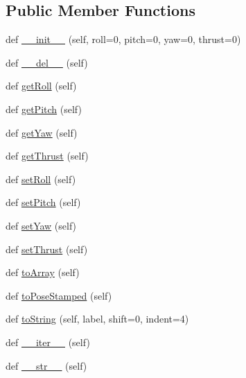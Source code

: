 \subsection*{Public Member Functions}
\begin{DoxyCompactItemize}
\item 
def \mbox{\hyperlink{classwindshape_1_1drone_1_1common_1_1_drone_attitude_1_1_drone_attitude_a3e991775a6809f6507e42dd571e42575}{\+\_\+\+\_\+init\+\_\+\+\_\+}} (self, roll=0, pitch=0, yaw=0, thrust=0)
\item 
def \mbox{\hyperlink{classwindshape_1_1drone_1_1common_1_1_drone_attitude_1_1_drone_attitude_a0918a45d1cf3fff9c41111d20b139ff0}{\+\_\+\+\_\+del\+\_\+\+\_\+}} (self)
\item 
def \mbox{\hyperlink{classwindshape_1_1drone_1_1common_1_1_drone_attitude_1_1_drone_attitude_a8cf53f4c965b1bf6d8694372a87a1b1f}{get\+Roll}} (self)
\item 
def \mbox{\hyperlink{classwindshape_1_1drone_1_1common_1_1_drone_attitude_1_1_drone_attitude_a59925ea9211fb77379912b046a8ad669}{get\+Pitch}} (self)
\item 
def \mbox{\hyperlink{classwindshape_1_1drone_1_1common_1_1_drone_attitude_1_1_drone_attitude_ad73d293c12238fb9307f08cf0883c135}{get\+Yaw}} (self)
\item 
def \mbox{\hyperlink{classwindshape_1_1drone_1_1common_1_1_drone_attitude_1_1_drone_attitude_aec3fd39de28bfdc64005b0e9beb64351}{get\+Thrust}} (self)
\item 
def \mbox{\hyperlink{classwindshape_1_1drone_1_1common_1_1_drone_attitude_1_1_drone_attitude_ac85419be27b7512b724be6168ccb8a28}{set\+Roll}} (self)
\item 
def \mbox{\hyperlink{classwindshape_1_1drone_1_1common_1_1_drone_attitude_1_1_drone_attitude_a0bc38aba42c44d1c79867162af802163}{set\+Pitch}} (self)
\item 
def \mbox{\hyperlink{classwindshape_1_1drone_1_1common_1_1_drone_attitude_1_1_drone_attitude_aef125acf4c972ede21e327b3f1bde9f4}{set\+Yaw}} (self)
\item 
def \mbox{\hyperlink{classwindshape_1_1drone_1_1common_1_1_drone_attitude_1_1_drone_attitude_a3071d0f96fa4705fd4474a041075f9b2}{set\+Thrust}} (self)
\item 
def \mbox{\hyperlink{classwindshape_1_1drone_1_1common_1_1_drone_attitude_1_1_drone_attitude_a28c3c394be649cd84b4a636e8f7952c4}{to\+Array}} (self)
\item 
def \mbox{\hyperlink{classwindshape_1_1drone_1_1common_1_1_drone_attitude_1_1_drone_attitude_a4084bc01dc5a69a8458dab944441bd1d}{to\+Pose\+Stamped}} (self)
\item 
def \mbox{\hyperlink{classwindshape_1_1drone_1_1common_1_1_drone_attitude_1_1_drone_attitude_ab8a7d91f530c6cd77d9ba0f6a20084b9}{to\+String}} (self, label, shift=0, indent=4)
\item 
def \mbox{\hyperlink{classwindshape_1_1drone_1_1common_1_1_drone_attitude_1_1_drone_attitude_abe0b3446f225d7613eb2412a0731d6fc}{\+\_\+\+\_\+iter\+\_\+\+\_\+}} (self)
\item 
def \mbox{\hyperlink{classwindshape_1_1drone_1_1common_1_1_drone_attitude_1_1_drone_attitude_ac4e68e64f1c161596d87b15a7329cfce}{\+\_\+\+\_\+str\+\_\+\+\_\+}} (self)
\end{DoxyCompactItemize}
